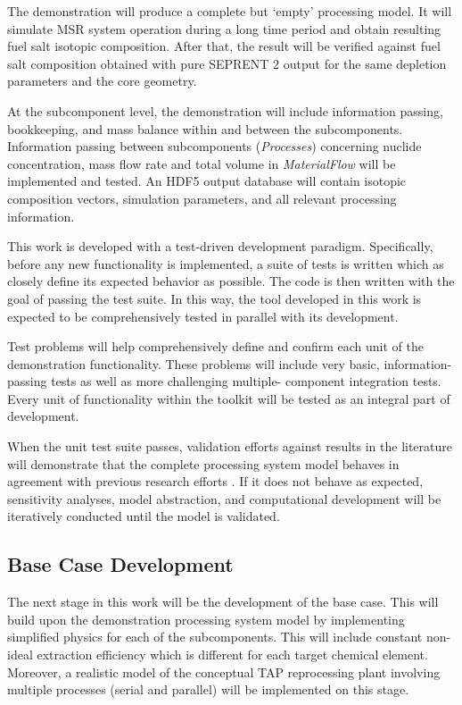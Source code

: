 The demonstration will produce a complete but `empty' processing 
model. It will simulate \gls{MSR} system operation during 
a long time period and obtain resulting fuel salt isotopic composition. 
After that, the result will be verified against fuel salt 
composition obtained with pure SEPRENT 2 output for the same 
depletion parameters and the core geometry.%

At the subcomponent level, the demonstration will include information 
passing, bookkeeping, and mass balance within and between the 
subcomponents. Information passing between subcomponents 
(\textit{Processes}) concerning nuclide concentration, mass flow rate 
and total volume in \textit{MaterialFlow} will be implemented and tested. 
An HDF5 output database will contain 
isotopic composition vectors, simulation 
parameters, and all relevant processing information.

This work is developed with a test-driven development paradigm. 
Specifically, before any new functionality is implemented, a suite of 
tests is written which as closely define its expected behavior as 
possible. The code is then written with the goal of passing the test 
suite. In this way, the tool developed in this work is expected to be
comprehensively tested in parallel with its development.

Test problems will help comprehensively define and confirm each unit 
of the demonstration functionality. These problems will include very 
basic, information-passing tests as well as more challenging multiple-
component integration tests. Every unit of functionality
within the toolkit will be tested as an integral part of development.

When the unit test suite passes, validation efforts against results 
in the literature will demonstrate that the complete 
processing system model behaves in agreement with previous research 
efforts \cite{rykhlevskii_advanced_2018, rykhlevskii_modeling_2019}. 
If it does not behave as expected, sensitivity analyses, 
model abstraction, and computational development will be iteratively 
conducted until the model is validated.

\subsection{Base Case Development}
The next stage in this work will be the development of the base case. 
This will build upon the demonstration processing system model by 
implementing simplified physics for each of the subcomponents. This 
will include constant non-ideal extraction efficiency which is 
different for each target chemical element. Moreover, a realistic 
model of the conceptual \gls{TAP} reprocessing plant involving 
multiple processes (serial and parallel) will be implemented on this 
stage. 

